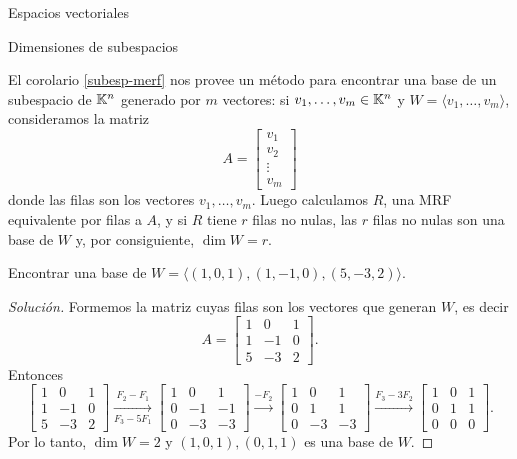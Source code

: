 \begin{chapter}{Espacios vectoriales}
\begin{section}{Dimensiones de subespacios}
    
    El  corolario  \ref{subesp-merf} nos provee un método para encontrar una base de un  subespacio de $\mathbb K^n$ generado por $m$ vectores: si $v_1,\ldots,v_m \in \mathbb K^n$ y $W = \langle v_1,\ldots,v_m\rangle$, consideramos la matriz 
    $$
    A = \begin{bmatrix}
    v_1 \\ v_2 \\ \vdots \\ v_m
    \end{bmatrix}
    $$
    donde las filas son los vectores $v_1,\ldots,v_m$. Luego calculamos $R$, una MRF equivalente por filas a $A$, y si $R$ tiene $r$ filas no nulas, las $r$ filas no nulas son una base de $W$ y, por consiguiente, $\dim W = r$. 
    
    \begin{ejemplo*}\label{ej-4.5}
        Encontrar una base  de $W= \langle (1,0,1), (1,-1,0), (5,-3,2)\rangle$. 
    \end{ejemplo*}
    \begin{proof}[Solución]
        Formemos la matriz cuyas filas son los vectores que generan $W$,  es decir 
        $$
        A = \begin{bmatrix} 1&0&1 \\ 1&-1&0 \\ 5&-3&2 \end{bmatrix}.
        $$
        Entonces
        \begin{equation*}
        \begin{bmatrix}1&0&1 \\ 1&-1&0 \\ 5&-3&2  \end{bmatrix}
        \underset{F_3-5F_1}{\stackrel{F_2- F_1}{\longrightarrow}} 
        \begin{bmatrix}1&0&1 \\ 0&-1&-1 \\ 0&-3&-3\end{bmatrix}
        \stackrel{-F_2}{\longrightarrow} 
        \begin{bmatrix}1&0&1 \\ 0&1&1 \\ 0&-3&-3\end{bmatrix}
        \stackrel{F_3 - 3F_2}{\longrightarrow}
        \begin{bmatrix}1&0&1 \\ 0&1&1 \\ 0&0&0\end{bmatrix}.
        \end{equation*}
        Por lo tanto, $\dim W =2$ y $(1,0,1), (0,1,1)$ es una base de  $W$.
    \end{proof}
    

\end{section}
\end{chapter}
